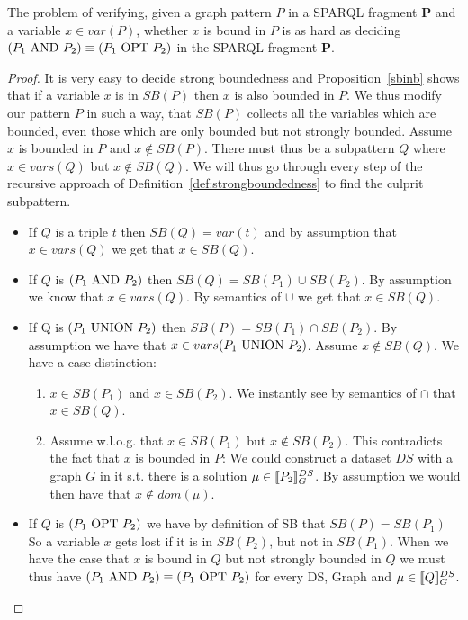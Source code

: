 \begin{theorem}\label{ezprop}
	The problem of verifying, given a graph pattern $P$ in a SPARQL fragment
	$\mathbf{P}$ and a variable $x \in
	var(P)$, whether $x$ is bound in $P$ is as hard as deciding $(P_1 \mbox{ AND } 
	P_2)
	\equiv (P_1 \mbox{ OPT } P_2)$ %
	in the SPARQL fragment $\mathbf{P}$.
\end{theorem}
\begin{proof}
	It is very easy to decide strong boundedness and Proposition~\ref{sbinb}
	shows that if a variable $x$ is in $SB(P)$ then $x$ is also bounded in $P$.
	We thus modify our pattern $P$ in such a way, that $SB(P)$ collects all the
	variables which are bounded, even those which are only bounded but not strongly
	bounded.
	Assume $x$ is bounded in $P$ and $x \notin SB(P)$.
	There must thus be a subpattern $Q$ where $x \in vars(Q)$ but $x \notin
	SB(Q)$. We will thus go through every step of the recursive approach of
	Definition~\ref{def:strongboundedness} to find the culprit subpattern.
	\begin{itemize}
		\item If $Q$ is a triple $t$ then $SB(Q) = var(t)$ and by assumption
			that $x \in vars(Q)$ we get that $x \in SB(Q)$. 

		\item If $Q$ is $(P_1 \mbox{ AND } P_2)$ then $SB(Q) = SB(P_1) \cup SB(P_2)$. By
			assumption we know that $x \in vars(Q)$. By semantics of $\cup$ we
			get that $x \in SB(Q)$. 
			
		\item If Q is $(P_1 \mbox{ UNION }  P_2)$ then $SB(P) = SB(P_1) \cap SB(P_2)$.
			By assumption we have that $x \in vars(P_1 \mbox{ UNION } P_2)$.
			Assume $x \notin SB(Q)$. 
			We have a case distinction:
			\begin{enumerate}
				\item $x \in SB(P_1)$ and $x \in SB(P_2)$.
				 We instantly see by semantics of $\cap$ that $x \in SB(Q)$. 

				\item Assume w.l.o.g. that $x \in SB(P_1)$ but $x \notin SB(P_2)$. 
					This contradicts the fact that $x$ is bounded in $P$:
					We could construct a dataset $DS$ with a graph $G$ in it s.t. there
					is a solution $\mu \in \llbracket P_2
					\rrbracket^{DS}_G$. By assumption we would then have that $x \notin dom(\mu)$.
			\end{enumerate}

		\item If $Q$ is $(P_1 \mbox{ OPT }  P_2)$ we have by definition of SB that $SB(P) = SB(P_1)$
			So a variable $x$ gets lost if it is in $SB(P_2)$, but not in
			$SB(P_1)$. When we have the case that $x$ is bound in $Q$ but not
			strongly bounded in $Q$ we must thus have $(P_1 \mbox{ AND }  P_2) \equiv
			(P_1 \mbox{ OPT }  P_2)$ for every DS, Graph and $\mu \in \llbracket Q
			\rrbracket^{DS}_G$.


\end{itemize}
\end{proof}

